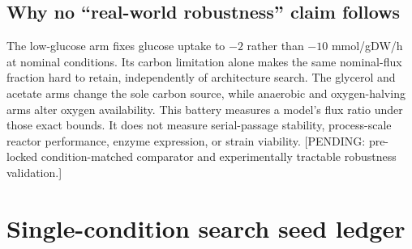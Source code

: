 \subsection{Why no ``real-world robustness'' claim follows}
The low-glucose arm fixes glucose uptake to $-2$ rather than $-10$ mmol/gDW/h at nominal conditions. Its carbon limitation alone makes the same nominal-flux fraction hard to retain, independently of architecture search. The glycerol and acetate arms change the sole carbon source, while anaerobic and oxygen-halving arms alter oxygen availability. This battery measures a model's flux ratio under those exact bounds. It does not measure serial-passage stability, process-scale reactor performance, enzyme expression, or strain viability. [PENDING: pre-locked condition-matched comparator and experimentally tractable robustness validation.]

\section{Single-condition search seed ledger}
